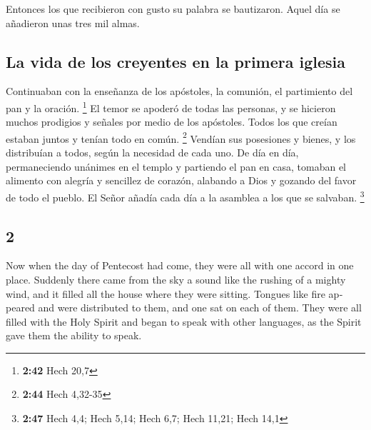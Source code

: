 \begin{paracol}{2}
 Entonces los que recibieron con gusto su palabra se
bautizaron. Aquel día se añadieron unas tres mil almas.

\hypertarget{la-vida-de-los-creyentes-en-la-primera-iglesia}{%
\subsection{La vida de los creyentes en la primera
iglesia}\label{la-vida-de-los-creyentes-en-la-primera-iglesia}}

 Continuaban con la enseñanza de los apóstoles, la
comunión, el partimiento del pan y la oración. \footnote{\textbf{2:42}
  Hech 20,7}  El temor se apoderó de todas las personas,
y se hicieron muchos prodigios y señales por medio de los apóstoles.
 Todos los que creían estaban juntos y tenían todo en
común. \footnote{\textbf{2:44} Hech 4,32-35}  Vendían sus
posesiones y bienes, y los distribuían a todos, según la necesidad de
cada uno.  De día en día, permaneciendo unánimes en el
templo y partiendo el pan en casa, tomaban el alimento con alegría y
sencillez de corazón,  alabando a Dios y gozando del
favor de todo el pueblo. El Señor añadía cada día a la asamblea a los
que se salvaban. \footnote{\textbf{2:47} Hech 4,4; Hech 5,14; Hech 6,7;
  Hech 11,21; Hech 14,1}

\switchcolumn
\begin{otherlanguage}{english}

\hypertarget{section-3}{%
\section{2}\label{section-3}}

 Now when the day of Pentecost had come, they were all
with one accord in one place.  Suddenly there came from
the sky a sound like the rushing of a mighty wind, and it filled all the
house where they were sitting.  Tongues like fire appeared
and were distributed to them, and one sat on each of them.
 They were all filled with the Holy Spirit and began to
speak with other languages, as the Spirit gave them the ability to
speak.


\end{otherlanguage}
\end{paracol}
